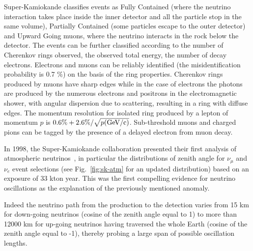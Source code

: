 Super-Kamiokande classifies events as Fully Contained (where the neutrino interaction takes place inside the inner detector and all the particle stop in the same volume), Partially Contained (some particles escape to the outer detector) and Upward Going muons, where the neutrino interacts in the rock below the detector. The events can be further classified according to the number of Cherenkov rings observed, the observed total energy, the number of decay electrons. Electrons and muons can be reliably identified (the misidentification probability is 0.7 \%) on the basis of the ring properties. Cherenkov rings produced by muons have sharp edges while in the case of electrons the photons are produced by the numerous electrons and positrons in the electromagnetic shower, with angular dispersion due to scattering, resulting in a ring with diffuse edges. The momentum resolution for isolated ring produced by a lepton of momentum $p$ is $0.6\% +2.6\%/\sqrt{p ({\rm GeV/c})}$. Sub-threshold muons and charged pions can be tagged by the presence of a delayed electron from muon decay.

In 1998, the Super-Kamiokande collaboration presented their first analysis of atmospheric neutrinos~\cite{Fukuda:1998mi}, in particular the distributions of zenith angle for $ \nu_\mu$ and $\nu_e$ event selections (see Fig.~\ref{fig:sk-atm} for an updated distribution) based on an exposure of 33 kton year. This was the first compelling evidence for neutrino oscillations as the explanation of the previously mentioned anomaly.  

Indeed the neutrino path from the production to the detection varies from 15 km for down-going neutrinos (cosine of the zenith angle equal to 1) to more than 12000 km for up-going neutrinos having traversed the whole Earth (cosine of the zenith angle equal to -1), thereby probing a large span of possible oscillation lengths. 


